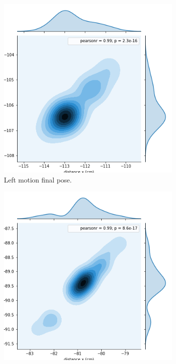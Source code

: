 \begin{figure}[ht!]
	\centering
	\begin{subfigure}[b]{0.3\textwidth}
		\includegraphics[width=\textwidth]{images/small_left.png}
		\caption{Left motion final pose.}
		\label{distribution-right-turn}
	\end{subfigure}
	\qquad
	\begin{subfigure}[b]{0.3\textwidth}
		\includegraphics[width=\textwidth]{images/small_straight.png}

\end{subfigure}
\end{figure}
